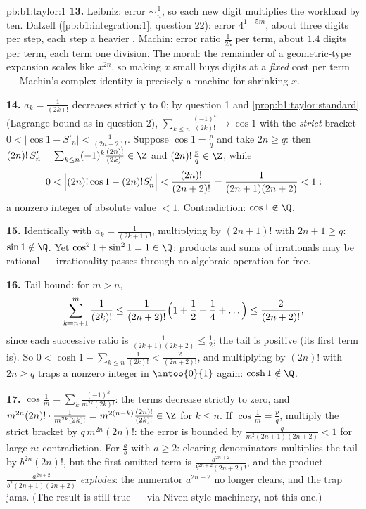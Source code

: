 \begin{solution}{pb:b1:taylor:1}
\textbf{13.} Leibniz: error $\sim \frac1n$, so each new digit
multiplies the workload by ten. Dalzell
(\cref{pb:b1:integration:1}, question 22): error $4^{1-5m}$,
about three digits per step, each step a heavier .
Machin: error ratio $\frac{1}{25}$ per term, about $1.4$ digits
per term, each term one division. The moral: the remainder of a
geometric-type expansion scales like $x^{2n}$, so making $x$
small buys digits at a \emph{fixed} cost per term --- Machin's
complex identity is precisely a machine for shrinking $x$.

\textbf{14.} $a_k = \frac{1}{(2k)!}$ decreases strictly to $0$;
by question 1 and \cref{prop:b1:taylor:standard} (Lagrange
bound as in question 2), $\sum_{k \leq n}\frac{(-1)^k}{(2k)!}
\to \cos 1$ with the \emph{strict} bracket $0 < \bigl|\cos 1 -
S'_n\bigr| < \frac{1}{(2n+2)!}$. Suppose $\cos 1 = \frac pq$ and
take $2n \geq q$: then $(2n)!\,S'_n = \sum_{k\leq n} (-1)^k
\frac{(2n)!}{(2k)!} \in \Z$ and $(2n)!\,\frac pq \in \Z$, while
\[
0 < \Bigl|(2n)!\cos 1 - (2n)!S'_n\Bigr| <
\frac{(2n)!}{(2n+2)!} = \frac{1}{(2n+1)(2n+2)} < 1 :
\]
a nonzero integer of absolute value $< 1$. Contradiction: $\cos
1 \notin \Q$.

\textbf{15.} Identically with $a_k = \frac{1}{(2k+1)!}$,
multiplying by $(2n+1)!$ with $2n + 1 \geq q$: $\sin 1 \notin
\Q$. Yet $\cos^2 1 + \sin^2 1 = 1 \in \Q$: products and sums of
irrationals may be rational --- irrationality passes through no
algebraic operation for free.

\textbf{16.} Tail bound: for $m > n$,
\[
\sum_{k=n+1}^{m} \frac{1}{(2k)!}
\leq \frac{1}{(2n+2)!}\Bigl(1 + \frac12 + \frac14 +
\dots\Bigr) \leq \frac{2}{(2n+2)!} ,
\]
since each successive ratio is $\frac{1}{(2k+1)(2k+2)} \leq
\frac12$; the tail is positive (its first term is). So $0 <
\cosh 1 - \sum_{k\leq n}\frac{1}{(2k)!} < \frac{2}{(2n+2)!}$,
and multiplying by $(2n)!$ with $2n \geq q$ traps a nonzero
integer in $\intoo{0}{1}$ again: $\cosh 1 \notin \Q$.

\textbf{17.} $\cos\frac1m = \sum_k
\frac{(-1)^k}{m^{2k}(2k)!}$: the terms decrease strictly to
zero, and $m^{2n}(2n)!\cdot\frac{1}{m^{2k}(2k)!} =
m^{2(n-k)}\frac{(2n)!}{(2k)!} \in \Z$ for $k \leq n$. If
$\cos\frac1m = \frac pq$, multiply the strict bracket by
$q\,m^{2n}(2n)!$: the error is bounded by
$\frac{q}{m^2(2n+1)(2n+2)} < 1$ for large $n$: contradiction.
For $\frac ab$ with $a \geq 2$: clearing denominators multiplies
the tail by $b^{2n}(2n)!$, but the first omitted term is
$\frac{a^{2n+2}}{b^{2n+2}(2n+2)!}$, and the product
$\frac{a^{2n+2}}{b^2(2n+1)(2n+2)}$ \emph{explodes}: the
numerator $a^{2n+2}$ no longer clears, and the trap jams.
(The result is still true --- via Niven-style machinery, not
this one.)


\end{solution}
